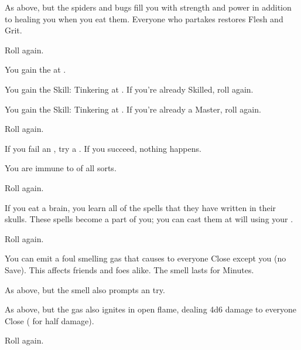 \begin{multicols*}{2}
 As above, but the spiders and bugs fill you with strength and power in addition to healing you when you eat them.  Everyone who partakes restores \MAX Flesh and \MAX Grit.

 Roll again.



 
\NC[Name=Crafty]

 You gain the  at .

 You gain the Skill: Tinkering at .  If you're already Skilled, roll again.

 You gain the Skill: Tinkering at .  If you're already a Master, roll again.

 Roll again.

\NC[Name=Crazy]

  If you fail an , try a .  If you succeed, nothing happens.

  You are immune to  of all sorts.

  Roll again.


\NC[Name=Eat Brains]

  If you eat a  brain, you learn all of the spells that they have written in their skulls.  These spells become a part of you; you can cast them at will using your \TAL.

  Roll again.

\newpage

\NC[Name=Gassy]

 You can emit a foul smelling gas that causes  to everyone Close except you (no Save). This affects friends and foes alike. The smell lasts for Minutes.

 As above, but the smell also prompts an  try.

 As above, but the gas also ignites in open flame, dealing 4d6 damage to everyone Close ( for half damage).

 Roll again.

\NC[Name=Go Night Night]


\end{multicols*}
